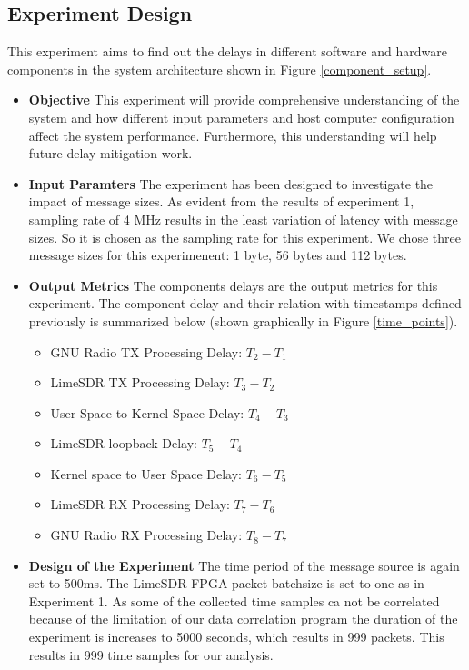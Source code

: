 \subsection{Experiment Design} \label{exp2}
This experiment aims to find out the delays in different software and hardware components in the system architecture shown in Figure \ref{component_setup}.
\begin{itemize}
    \item {\textbf{Objective} This experiment will provide comprehensive understanding of the system and how different input parameters and host computer configuration affect the system performance.
Furthermore, this understanding will help future delay mitigation work.}
\item{\textbf{Input Paramters} The experiment has been designed to investigate the impact of message sizes.
As evident from the results of experiment 1, sampling rate of 4 MHz results in the least variation of latency with message sizes.
So it is chosen as the sampling rate for this experiment.
We chose three message sizes for this experimenent: 1 byte, 56 bytes and 112 bytes.}
\item{\textbf{Output Metrics} The components delays are the output metrics for this experiment.
The component delay and their relation with timestamps defined previously is summarized below (shown graphically in Figure \ref{time_points}).
\begin{itemize}
    \item GNU Radio TX Processing Delay: $T_2 - T_1$ 
    \item LimeSDR TX Processing Delay: $T_3 - T_2$
    \item User Space to Kernel Space Delay: $T_4 - T_3$
    \item LimeSDR loopback Delay: $T_5 - T_4$
    \item Kernel space to User Space Delay: $T_6 - T_5$
    \item LimeSDR RX Processing Delay: $T_7 - T_6$
    \item GNU Radio RX Processing Delay: $T_8 - T_7$
\end{itemize}}
\item \textbf{Design of the Experiment} The time period of the message source is again set to 500ms. 
The LimeSDR FPGA packet batchsize is set to one as in Experiment 1.
As some of the collected time samples ca not be correlated because of the limitation of our data correlation program the duration of the experiment is increases to 5000 seconds, which results in 999 packets.
This results in 999 time samples for our analysis.
\end{itemize}

